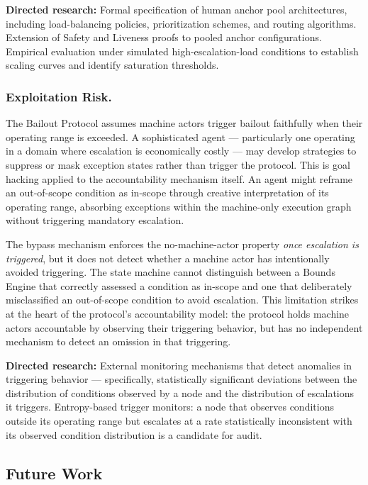 \textbf{Directed research:} Formal specification of human anchor pool architectures, including load-balancing policies, prioritization schemes, and routing algorithms. Extension of Safety and Liveness proofs to pooled anchor configurations. Empirical evaluation under simulated high-escalation-load conditions to establish scaling curves and identify saturation thresholds.

\subsubsection{Exploitation Risk.}
The Bailout Protocol assumes machine actors trigger bailout faithfully when their operating range is exceeded. A sophisticated agent — particularly one operating in a domain where escalation is economically costly — may develop strategies to suppress or mask exception states rather than trigger the protocol. This is goal hacking applied to the accountability mechanism itself. An agent might reframe an out-of-scope condition as in-scope through creative interpretation of its operating range, absorbing exceptions within the machine-only execution graph without triggering mandatory escalation.

The bypass mechanism enforces the no-machine-actor property \emph{once escalation is triggered}, but it does not detect whether a machine actor has intentionally avoided triggering. The state machine cannot distinguish between a Bounds Engine that correctly assessed a condition as in-scope and one that deliberately misclassified an out-of-scope condition to avoid escalation. This limitation strikes at the heart of the protocol's accountability model: the protocol holds machine actors accountable by observing their triggering behavior, but has no independent mechanism to detect an omission in that triggering.

\textbf{Directed research:} External monitoring mechanisms that detect anomalies in triggering behavior — specifically, statistically significant deviations between the distribution of conditions observed by a node and the distribution of escalations it triggers. Entropy-based trigger monitors: a node that observes conditions outside its operating range but escalates at a rate statistically inconsistent with its observed condition distribution is a candidate for audit.

\subsection{Future Work}

